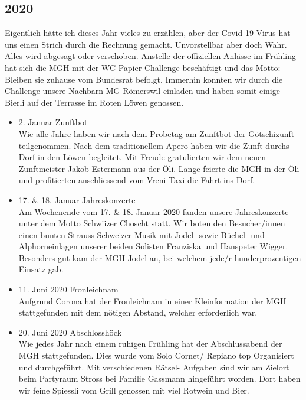\subsection*{2020}
\begin{history}

      Eigentlich hätte ich dieses Jahr vieles zu erzählen, aber der Covid 19 Virus
      hat uns einen Strich durch die Rechnung gemacht. Unvorstellbar aber doch
      Wahr. Alles wird abgesagt oder verschoben. Anstelle der offiziellen Anlässe
      im Frühling hat sich die MGH mit der WC-Papier Challenge beschäftigt und das
      Motto: Bleiben sie zuhause vom Bundesrat befolgt. Immerhin konnten wir durch
      die Challenge unsere Nachbarn MG Römerswil einladen und haben somit einige
      Bierli auf der Terrasse im Roten Löwen genossen.

      \begin{itemize}

            \item 2. Januar Zunftbot\\
                  Wie alle Jahre haben wir nach dem Probetag am Zunftbot der Götschizunft teilgenommen.
                  Nach dem traditionellem Apero haben wir die Zunft durchs Dorf in den Löwen begleitet.
                  Mit Freude gratulierten wir dem neuen Zunftmeister Jakob Estermann aus der Öli.
                  Lange feierte die MGH in der Öli und profitierten anschliessend vom Vreni Taxi die Fahrt ins Dorf.

            \item 17. \& 18. Januar Jahreskonzerte\\
                  Am Wochenende vom 17. \& 18. Januar 2020 fanden unsere Jahreskonzerte unter dem Motto
                  Schwiizer Choscht statt. Wir boten den Besucher/innen einen bunten Strauss Schweizer Musik mit
                  Jodel- sowie Büchel- und Alphorneinlagen unserer beiden Solisten Franziska und Hanspeter Wigger.
                  Besonders gut kam der MGH Jodel an, bei welchem jede/r hunderprozentigen Einsatz gab.

            \item 11. Juni 2020 Fronleichnam\\
                  Aufgrund Corona hat der Fronleichnam in einer Kleinformation der
                  MGH stattgefunden mit dem nötigen Abstand, welcher erforderlich
                  war.

            \item 20. Juni 2020 Abschlosshöck\\
                  Wie jedes Jahr nach einem ruhigen Frühling hat der Abschlussabend
                  der MGH stattgefunden. Dies wurde vom Solo Cornet/ Repiano top
                  Organisiert und durchgeführt. Mit verschiedenen Rätsel- Aufgaben
                  sind wir am Zielort beim Partyraum Stross bei Familie Gassmann
                  hingeführt worden. Dort haben wir feine Spiessli vom Grill
                  genossen mit viel Rotwein und Bier.


\end{itemize}
\end{history}
